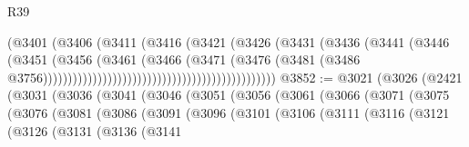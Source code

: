\begin{lexlean}{R39}
\begin{coremodule}
                                                              (@3401
                                                                (@3406
                                                                  (@3411
                                                                    (@3416
                                                                      (@3421
                                                                        (@3426
                                                                          (@3431
                                                                            (@3436
                                                                              (@3441
                                                                                (@3446
                                                                                  (@3451
                                                                                    (@3456
                                                                                      (@3461
                                                                                        (@3466
                                                                                          (@3471
                                                                                            (@3476
                                                                                              (@3481
                                                                                                (@3486
                                                                                                  @3756)))))))))))))))))))))))))))))))))))))))))))))))
@3852 := @3021
    (@3026
      (@2421
        (@3031
          (@3036
            (@3041
              (@3046
                (@3051
                  (@3056
                    (@3061
                      (@3066
                        (@3071
                          (@3075
                            (@3076
                              (@3081
                                (@3086
                                  (@3091
                                    (@3096
                                      (@3101
                                        (@3106
                                          (@3111
                                            (@3116
                                              (@3121
                                                (@3126
                                                  (@3131
                                                    (@3136
                                                      (@3141

\end{coremodule}
\end{lexlean}
